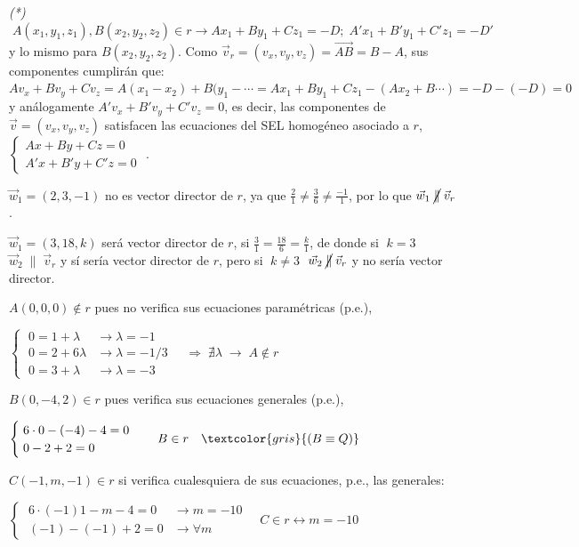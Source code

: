 \noindent \textcolor{gris}{\textit{(*)}\scriptsize{$\;A(x_1,y_1,z_1), B(x_2,y_2,z_2) \in r \to Ax_1+By_1+Cz_1=-D; \; A'x_1+B'y_1+C'z_1=-D'$ y lo mismo para $B(x_2,y_2,z_2)$. Como $\vec v_r=(v_x,v_y,v_z)=\overrightarrow{AB}=B-A$, sus componentes cumplirán que: $Av_x+Bv_y+Cv_z=A(x_1-x_2)+B(y_1- \cdots =Ax_1+By_1+Cz_1-(Ax_2+B\cdots)=-D-(-D)=0$ y análogamente $A'v_x+B'v_y+C'v_z=0$, es decir, las componentes de $\vec v=(v_x,v_y,v_z)$ satisfacen las ecuaciones del SEL homogéneo asociado a $r$, $\begin{cases} Ax+By+Cz=0\\A'x+B'y+C'z=0 \end{cases}$ }}\normalsize{.}

$\vec w_1=(2,3,-1)$ no es vector director de $r$, ya que $\frac{2}{1} \neq \frac {3}{6} \neq \frac {-1}{1}$, por lo que $\vec w_1 \; \cancel{\parallel}  \; \vec v_r$.

$\vec w_1=(3,18,k)$ será vector director de $r$, si $\frac{3}{1} = \frac {18}{6} = \frac {k}{1}$, de donde si $\; k=3 \;$ $\vec w_2\; \parallel  \; \vec v_r$ y sí sería vector director de $r$, pero si  $\; k\neq 3 \;$  $\vec w_2 \; \cancel{\parallel}  \; \vec v_r$ y no sería vector director.

$A(0,0,0)\notin r$ pues no verifica sus ecuaciones paramétricas (p.e.), 

\noindent $ \begin{cases} \; 0=1+\lambda  &\to \lambda=-1\\ \;0=2+6\lambda & \to \lambda=-1/3 \\ \; 0=3+\lambda & \to \lambda=-3 \end{cases}  \quad \Rightarrow \; \nexists \lambda \; \to \; A \notin r$

$B(0,-4,2) \in r$ pues verifica sus ecuaciones generales (p.e.),

\noindent $\begin{cases} \; 6\cdot 0-(-4)-4=0\\ \; 0-2+2=0 \end{cases}  \quad B \in r \quad \textcolor{gris}{(B\equiv Q)}$

$C(-1,m,-1) \in r$ si verifica cualesquiera de sus ecuaciones, p.e., las generales:

\noindent $ \begin{cases} \; 6\cdot (-1)1-m-4=0 & \to m=-10\\ \; (-1)-(-1)+2=0 &\to \forall m \end{cases}  \quad C\in r \leftrightarrow m=-10$

